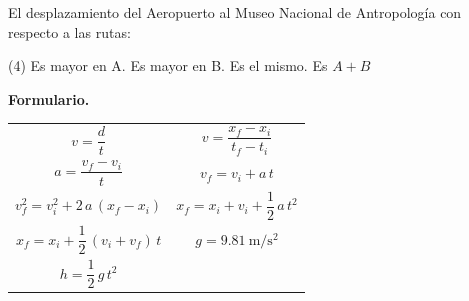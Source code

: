 \documentclass[12pt, letter]{exam}
\begin{document}
\begin{questions}
\begin{figure}[H]
    \end{figure}
    El desplazamiento del Aeropuerto al Museo Nacional de Antropología con respecto a las rutas:
    \begin{tasks}(4)
        \task Es mayor en A.
        \task Es mayor en B.
        \task Es el mismo.
        \task Es $A + B$
    \end{tasks}

\end{questions}

\newpage
\textbf{\huge{Formulario.}}
\begin{table}[H]
    \centering
    \setlength{\tabcolsep}{40pt}
    \renewcommand{\arraystretch}{2.5}
    \begin{tabular}{c  c}
            $v = \dfrac{d}{t}$ & $v = \dfrac{x_{f} - x_{i}}{t_{f} - t_{i}}$ \\
            $a = \dfrac{v_{f} - v_{i}}{t}$ & $v_{f} = v_{i} + a \, t$ \\
            $v_{f}^{2} = v_{i}^{2} + 2 \, a \, \left(x_{f} - x_{i} \right)$ & $x_{f} = x_{i} + v_{i} + \dfrac{1}{2} \, a \, t^{2}$ \\
            $x_{f} = x_{i} + \dfrac{1}{2} \, \left(v_{i} + v_{f} \right) \, t$ & $g = \SI{9.81}{\meter\per\square\second}$ \\
            $h =\dfrac{1}{2} \,g \, t^{2}$ & \\
\end{tabular}
\end{table}
\end{document}

